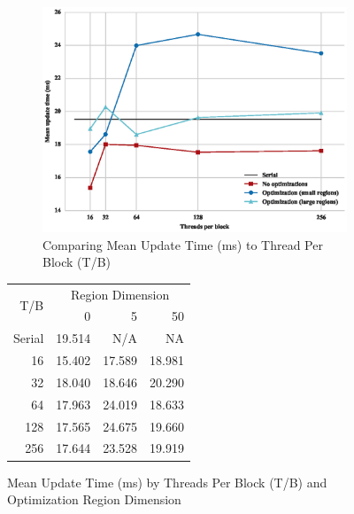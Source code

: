 \documentclass[onecolumn,12pt]{IEEEtran}
\begin{document}
  \begin{figure}[t]
    \centering
    \begin{subfigure}[t]{0.3\textwidth}
    \includegraphics[width=1\textwidth]{../images/plot.eps}
      \caption{Comparing Mean Update Time (ms) to Thread Per Block (T/B)}
      \label{fig:comparison}  
    \end{subfigure}
    \begin{subtable}[t]{0.4\textwidth}
      \centering
        \begin{tabular}{@{}*{4}{r}@{}} \toprule
          \multirow{2}{*}{T/B} 
          & \multicolumn{3}{c}{Region Dimension} \\
                           & 0        & 5       & 50 \\ \midrule 
          Serial           &  19.514  &  N/A    & NA \\
          16               &  15.402  &  17.589 &  18.981 \\
          32               &  18.040  &  18.646 &  20.290 \\
          64               &  17.963  &  24.019 &  18.633 \\
          128              &  17.565  &  24.675 &  19.660 \\
          256              &  17.644  &  23.528 & 19.919 \\ \bottomrule
      \end{tabular}
      \caption{Mean Update Time (ms) by Threads Per Block (T/B) and Optimization Region Dimension}
      \label{tab:means}
    \end{subtable}

  \end{figure}
\end{document}
